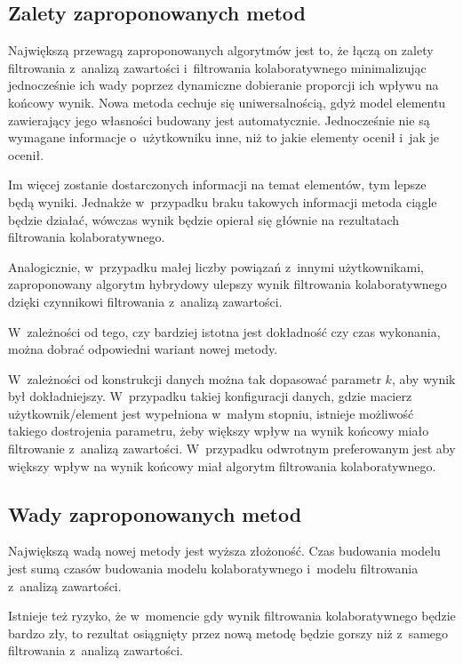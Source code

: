 \documentclass[twoside]{iisthesis}
\begin{document}
		 \subsection{Zalety zaproponowanych metod}
		 
		 Największą przewagą zaproponowanych algorytmów jest to, że łączą on zalety filtrowania z~analizą zawartości i~filtrowania kolaboratywnego minimalizując jednocześnie ich wady poprzez dynamiczne dobieranie proporcji ich wpływu na końcowy wynik. Nowa metoda cechuje się uniwersalnością, gdyż model elementu zawierający jego własności budowany jest automatycznie. Jednocześnie nie są wymagane informacje o~użytkowniku inne, niż to jakie elementy ocenił i~jak je ocenił. 
		 
		 Im więcej zostanie dostarczonych informacji na temat elementów, tym lepsze będą wyniki. Jednakże w~przypadku braku takowych informacji metoda ciągle będzie działać,  wówczas wynik będzie opierał się głównie na rezultatach filtrowania kolaboratywnego.
		 
		 Analogicznie, w~przypadku małej liczby powiązań z~innymi użytkownikami, zaproponowany algorytm hybrydowy ulepszy wynik filtrowania kolaboratywnego dzięki czynnikowi filtrowania z~analizą zawartości. 
		 
		 W~zależności od tego, czy bardziej istotna jest dokładność czy czas wykonania, można dobrać odpowiedni wariant nowej metody. 
		 
		 W~zależności od konstrukcji danych można tak dopasować parametr $k$, aby wynik był dokładniejszy. W~przypadku takiej konfiguracji danych, gdzie macierz użytkownik\-/element jest wypełniona w~małym stopniu, istnieje możliwość takiego dostrojenia parametru, żeby większy wpływ na wynik końcowy miało filtrowanie z~analizą zawartości. W~przypadku odwrotnym preferowanym jest aby większy wpływ na wynik końcowy miał algorytm filtrowania kolaboratywnego.
		 
		 \subsection{Wady zaproponowanych metod}
		 
		 Największą wadą nowej metody jest wyższa złożoność. Czas budowania modelu jest sumą czasów budowania modelu kolaboratywnego i~modelu filtrowania z~analizą zawartości. 
		 
		 Istnieje też ryzyko, że w~momencie gdy wynik filtrowania kolaboratywnego będzie bardzo zły, to rezultat osiągnięty przez nową metodę będzie gorszy niż z~samego filtrowania z~analizą zawartości. 
		 
\end{document}
